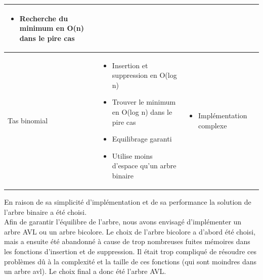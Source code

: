 \documentclass[12pt,titlepage]{report}
\begin{document}
\begin{center}
\begin{tabular}{|p{4cm}|p{6cm}|p{6cm}|}
\begin{itemize}[leftmargin=*]
            \item Recherche du minimum en O(n) dans le pire cas
        \end{itemize}\\ 
    \hline
        Tas binomial &
        \begin{itemize}[leftmargin=*]
            \item Insertion et suppression en O(log n)
            \item Trouver le minimum en O(log n) dans le pire cas
            \item Equilibrage garanti
            \item Utilise moins d'espace qu'un arbre binaire
        \end{itemize} &
        \begin{itemize}[leftmargin=*]
            \item Implémentation complexe
        \end{itemize}\\ 
    \hline
\end{tabular}
\end{center}

En raison de sa simplicité d'implémentation et de sa performance la solution de l'arbre binaire a été choisi.\\
Afin de garantir l'équilibre de l'arbre, nous avons envisagé d'implémenter un arbre AVL ou un arbre bicolore. Le choix de l'arbre bicolore a d'abord été choisi, mais a ensuite été abandonné à cause de trop nombreuses fuites mémoires dans les fonctions d'insertion et de suppression. Il était trop compliqué de résoudre ces problèmes dû à la complexité et la taille de ces fonctions (qui sont moindres dans un arbre avl). Le choix final a donc été l'arbre AVL.
\\
\end{document}
